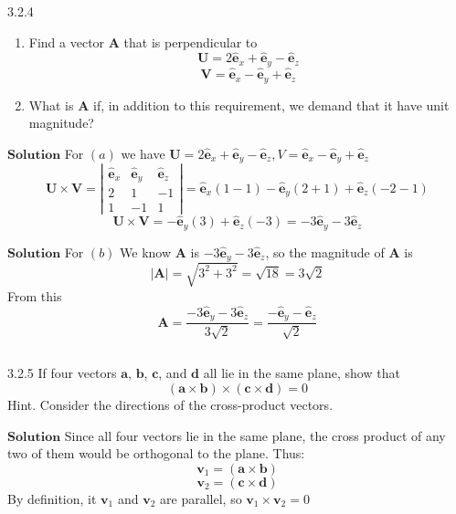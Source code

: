\newpage
 
\begin{mybox}{3.2.4}
\begin{enumerate}[$(a)$]
\item Find a vector $\mathbf{A}$ that is perpendicular to
$$\mathbf{U}=2 \hat{\mathbf{e}}_{x}+\hat{\mathbf{e}}_{y}-\hat{\mathbf{e}}_{z}$$
$$\mathbf{V}=\hat{\mathbf{e}}_{x}-\hat{\mathbf{e}}_{y}+\hat{\mathbf{e}}_{z}$$
\item What is $\mathbf{A}$ if, in addition to this requirement, we demand that it have unit
magnitude?
\end{enumerate}
\end{mybox}

$\boxed{\textbf{Solution}}$ For $(a)$ we have $\mathbf{U}=2 \hat{\mathbf{e}}_{x}+\hat{\mathbf{e}}_{y}-\hat{\mathbf{e}}_{z}, V=\hat{\mathbf{e}}_{x}-\hat{\mathbf{e}}_{y}+\hat{\mathbf{e}}_{z}$
$$
\mathbf{U} \times \mathbf{V}=\left|\begin{array}{ccc}
\hat{\mathbf{e}}_{x} & \hat{\mathbf{e}}_{y} & \hat{\mathbf{e}}_{z} \\
2 & 1 & -1 \\
1 & -1 & 1
\end{array}\right|=\hat{\mathbf{e}}_{x}(1-1)-\hat{\mathbf{e}}_{y}(2+1)+\hat{\mathbf{e}}_{z}(-2-1)
$$
$$
\mathbf{U} \times \mathbf{V}=-\hat{\mathbf{e}}_{y}(3)+\hat{\mathbf{e}}_{z}(-3)=-3 \hat{\mathbf{e}}_{y}-3 \hat{\mathbf{e}}_{z}
$$

$\boxed{\textbf{Solution}}$ For $(b)$ We know $\mathbf{A}$ is $-3 \hat{\mathbf{e}}_{y}-3 \hat{\mathbf{e}}_{z}$, so the magnitude of $\mathbf{A}$ is
$$|\mathbf{A}|=\sqrt{3^{2}+3^{2}}=\sqrt{18}=3 \sqrt{2}$$
From this 
$$\mathbf{A}=\frac{-3 \hat{\mathbf{e}}_{y}-3 \hat{\mathbf{e}}_{z}}{3 \sqrt{2}}=\frac{-\hat{\mathbf{e}}_{y}-\hat{\mathbf{e}}_{z}}{\sqrt{2}}$$


$$$$



\begin{mybox}{3.2.5}
If four vectors $\mathbf{a}$, $\mathbf{b}$, $\mathbf{c}$, and $\mathbf{d}$ all lie in the same plane, show that
$$
(\mathbf{a} \times \mathbf{b}) \times(\mathbf{c} \times \mathbf{d})=0
$$
Hint. Consider the directions of the cross-product vectors.
\end{mybox}

$\boxed{\textbf{Solution}}$ Since all four vectors lie in the same plane, the cross product of any two of them would be orthogonal to the plane. Thus:
$$\mathbf{v}_1 = (\mathbf{a} \times \mathbf{b})$$
$$\mathbf{v}_2 = (\mathbf{c} \times \mathbf{d})$$
By definition, it $\mathbf{v}_1$ and $\mathbf{v}_2$ are parallel, so $\mathbf{v}_1 \times \mathbf{v}_2 = 0$



